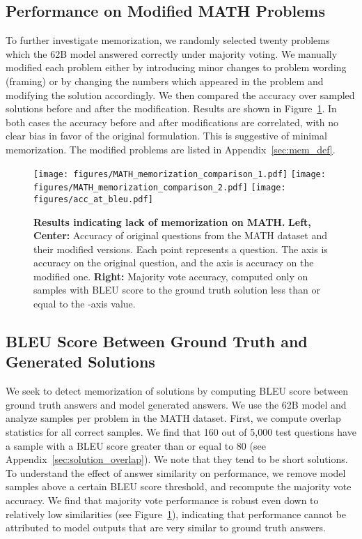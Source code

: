 \documentclass{article}
\begin{document}
\subsection{Performance on Modified MATH Problems}
To further investigate memorization, we randomly selected twenty problems which the 62B model answered correctly under majority voting. We manually modified each problem either by introducing minor changes to problem wording (framing) or by changing the numbers which appeared in the problem and modifying the solution accordingly.
We then compared the accuracy over sampled solutions before and after the modification. Results are shown in Figure~\ref{fig:memorization_correct_solutions}. In both cases the accuracy before and after modifications are correlated, with no clear bias in favor of the original formulation. This is suggestive of minimal memorization. The modified problems are listed in Appendix~\ref{sec:mem_def}.

\begin{figure}[ht!]
\begin{center}
\texttt{[image: figures/MATH\_memorization\_comparison\_1.pdf]}
\texttt{[image: figures/MATH\_memorization\_comparison\_2.pdf]}
\texttt{[image: figures/acc\_at\_bleu.pdf]}
\caption{\small
\textbf{Results indicating lack of memorization on MATH.}
\textbf{Left, Center:}
Accuracy of original questions from the MATH dataset and their modified versions. Each point represents a question. The  axis is accuracy on the original question, and the  axis is accuracy on the modified one.
\textbf{Right:} Majority vote accuracy, computed only on samples with BLEU score to the ground truth solution less than or equal to the -axis value.
}
\label{fig:memorization_correct_solutions}
\end{center}
\end{figure}



\subsection{BLEU Score Between Ground Truth and Generated Solutions}

We seek to detect memorization of solutions by computing BLEU score between ground truth answers and model generated answers. We use the 62B model and analyze  samples per problem in the MATH dataset.  First, we compute overlap statistics for all correct samples.  
We find that 160 out of 5,000 test questions have a sample with a BLEU score greater than or equal to 80 (see Appendix~\ref{sec:solution_overlap}). 
We note that they tend to be short solutions. 
To understand the effect of answer similarity on performance, we remove model samples above a certain BLEU score threshold, and recompute the majority vote accuracy. We find that majority vote performance is robust even down to relatively low similarities (see Figure~\ref{fig:memorization_correct_solutions}), indicating that performance cannot be attributed to model outputs that are very similar to ground truth answers.
\end{document}
